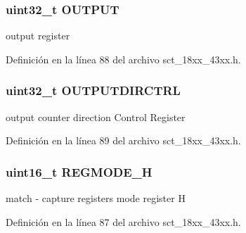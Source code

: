 \subsubsection[{\texorpdfstring{O\+U\+T\+P\+UT}{OUTPUT}}]{ uint32\+\_\+t O\+U\+T\+P\+UT}\hypertarget{struct_l_p_c___s_c_t___t_af8cbc88b1275130c0ad556c781471161}{}\label{struct_l_p_c___s_c_t___t_af8cbc88b1275130c0ad556c781471161}
output register 

Definición en la línea 88 del archivo sct\+\_\+18xx\+\_\+43xx.\+h.

\subsubsection[{\texorpdfstring{O\+U\+T\+P\+U\+T\+D\+I\+R\+C\+T\+RL}{OUTPUTDIRCTRL}}]{ uint32\+\_\+t O\+U\+T\+P\+U\+T\+D\+I\+R\+C\+T\+RL}\hypertarget{struct_l_p_c___s_c_t___t_a4539e2859db7225bacea6d8c60507680}{}\label{struct_l_p_c___s_c_t___t_a4539e2859db7225bacea6d8c60507680}
output counter direction Control Register 

Definición en la línea 89 del archivo sct\+\_\+18xx\+\_\+43xx.\+h.

\subsubsection[{\texorpdfstring{R\+E\+G\+M\+O\+D\+E\+\_\+H}{REGMODE_H}}]{ uint16\+\_\+t R\+E\+G\+M\+O\+D\+E\+\_\+H}\hypertarget{struct_l_p_c___s_c_t___t_ad4659f70549f9f8ed120eb7c132ebf2e}{}\label{struct_l_p_c___s_c_t___t_ad4659f70549f9f8ed120eb7c132ebf2e}
match -\/ capture registers mode register H 

Definición en la línea 87 del archivo sct\+\_\+18xx\+\_\+43xx.\+h.

